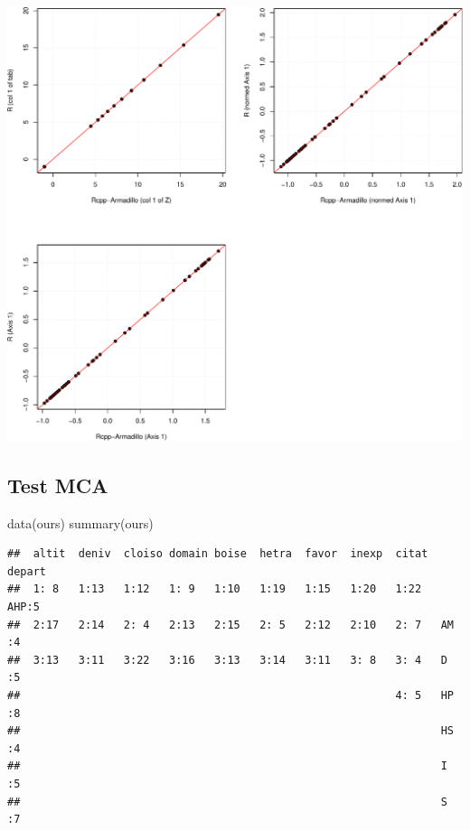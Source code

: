 \documentclass[
  10pt,
]{article}
\newenvironment{Shaded}{\begin{snugshade}}{\end{snugshade}}
\newcommand{\NormalTok}[1]{#1}
\begin{document}
\includegraphics{RandPytonAnalysisPDF_files/figure-latex/unnamed-chunk-60-1.pdf}

\hypertarget{test-mca}{%
\subsection{Test MCA}\label{test-mca}}

\begin{Shaded}
\begin{Highlighting}[]
\NormalTok{data(ours)}
\NormalTok{summary(ours)}
\end{Highlighting}
\end{Shaded}

\begin{verbatim}
##  altit  deniv  cloiso domain boise  hetra  favor  inexp  citat  depart 
##  1: 8   1:13   1:12   1: 9   1:10   1:19   1:15   1:20   1:22   AHP:5  
##  2:17   2:14   2: 4   2:13   2:15   2: 5   2:12   2:10   2: 7   AM :4  
##  3:13   3:11   3:22   3:16   3:13   3:14   3:11   3: 8   3: 4   D  :5  
##                                                          4: 5   HP :8  
##                                                                 HS :4  
##                                                                 I  :5  
##                                                                 S  :7
\end{verbatim}
\end{document}
